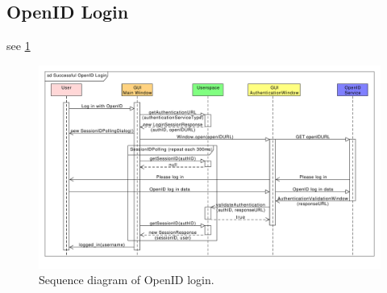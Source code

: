 \subsection{OpenID Login}

see \ref{rpc:sd:openid_login}

\begin{figure}[h]
\begin{center}
\includegraphics[scale=0.55, angle=90]{figures/openid_login_sequence.pdf}
\end{center}
\caption{Sequence diagram of OpenID login.}\label{rpc:sd:openid_login}
\end{figure}

